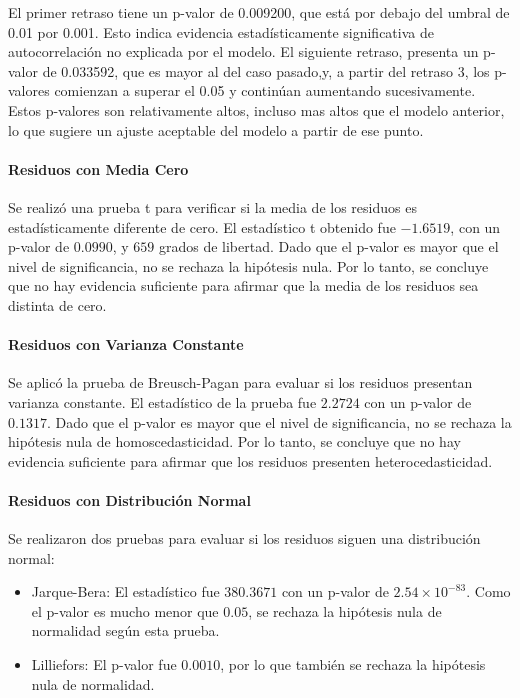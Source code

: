 \documentclass[12pt,letterpaper]{article}   %
\begin{document}
El primer retraso tiene un p-valor de 0.009200, que está por debajo del umbral de 0.01 por 0.001. Esto indica evidencia estadísticamente significativa de autocorrelación no explicada por el modelo. El siguiente retraso, presenta un p-valor de 0.033592, que es mayor al del caso pasado,y, a partir del retraso 3, los p-valores comienzan a superar el 0.05 y continúan aumentando sucesivamente. Estos p-valores son relativamente altos, incluso mas altos que el modelo anterior, lo que sugiere un ajuste aceptable del modelo a partir de ese punto.



\paragraph{Residuos con Media Cero}
Se realizó una prueba t para verificar si la media de los residuos es estadísticamente diferente de cero. El estadístico t obtenido fue $-1.6519$, con un p-valor de $0.0990$, y $659$ grados de libertad. Dado que el p-valor es mayor que el nivel de significancia, no se rechaza la hipótesis nula. Por lo tanto, se concluye que no hay evidencia suficiente para afirmar que la media de los residuos sea distinta de cero.

\paragraph{Residuos con Varianza Constante}
Se aplicó la prueba de Breusch-Pagan para evaluar si los residuos presentan varianza constante. El estadístico de la prueba fue $2.2724$ con un p-valor de $0.1317$. Dado que el p-valor es mayor que el nivel de significancia, no se rechaza la hipótesis nula de homoscedasticidad. Por lo tanto, se concluye que no hay evidencia suficiente para afirmar que los residuos presenten heterocedasticidad.

\paragraph{Residuos con Distribución Normal}
Se realizaron dos pruebas para evaluar si los residuos siguen una distribución normal:

\begin{itemize}
    \item Jarque-Bera: El estadístico fue $380.3671$ con un p-valor de $2.54 \times 10^{-83}$. Como el p-valor es mucho menor que $0.05$, se rechaza la hipótesis nula de normalidad según esta prueba.
    \item Lilliefors: El p-valor fue $0.0010$, por lo que también se rechaza la hipótesis nula de normalidad.
\end{itemize}
\end{document}
